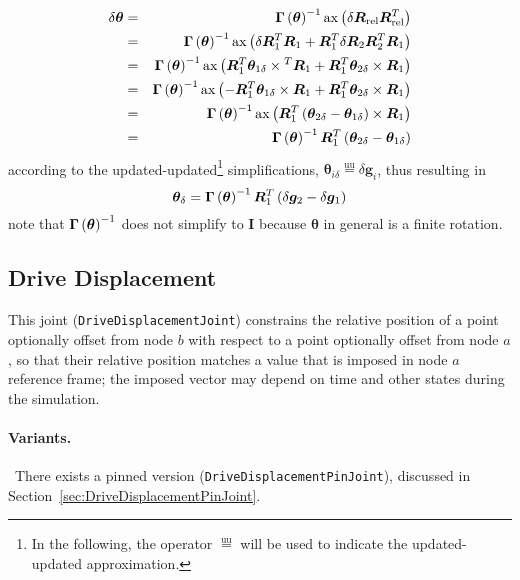 \documentclass[10pt,dvips,fleqn,subeqn]{report}
\newcommand{\T}[1]{\bm{#1}}
\newcommand{\equu}{\overset{\text{uu}}{=}}
\begin{document}
\begin{eqnarray*}
	\delta\T{\theta}
		& = & \T{\Gamma}\plbr{\T{\theta}}^{-1} 
			\llk{ax}\plbr{\delta\T{R}_{\text{rel}} \T{R}_{\text{rel}}^T} \\
		& = & \T{\Gamma}\plbr{\T{\theta}}^{-1} \llk{ax}\plbr{
			\delta\T{R}_1^T \T{R}_1
			+ \T{R}_1^T \delta\T{R}_2 \T{R}_2^T \T{R}_1
		} \\
		& = & \T{\Gamma}\plbr{\T{\theta}}^{-1} \llk{ax}\plbr{
			\T{R}_1^T \T{\theta}_{1\delta}\times{}^T \T{R}_1
			+ \T{R}_1^T \T{\theta}_{2\delta}\times{} \T{R}_1
		} \\
		& = & \T{\Gamma}\plbr{\T{\theta}}^{-1} \llk{ax}\plbr{
			- \T{R}_1^T \T{\theta}_{1\delta}\times{} \T{R}_1
			+ \T{R}_1^T \T{\theta}_{2\delta}\times{} \T{R}_1
		} \\
		& = & \T{\Gamma}\plbr{\T{\theta}}^{-1}
			\llk{ax} \plbr{
				\T{R}_1^T \plbr{
					\T{\theta}_{2\delta}
					- \T{\theta}_{1\delta}
				}\times \T{R}_1
			} \\
		& = & \T{\Gamma}\plbr{\T{\theta}}^{-1} \T{R}_1^T \plbr{
			\T{\theta}_{2\delta} - \T{\theta}_{1\delta}
		}
\end{eqnarray*}
according to the updated-updated\footnote{In the following, 
the operator $\equu$ will be used to indicate the updated-updated
approximation.} simplifications,
$\T{\theta}_{i\delta}\equu\delta\T{g}_i$, thus resulting in
\begin{equation}
	\T{\theta}_{\delta} = \T{\Gamma}\plbr{\T{\theta}}^{-1} \T{R}_1^T \plbr{
		\delta\T{g}_2 - \delta\T{g}_1
	}
	\label{eq:DRIVE-HINGE-theta-delta}
\end{equation}
note that $\T{\Gamma}\plbr{\T{\theta}}^{-1}$ does not simplify to $\T{I}$
because $\T{\theta}$ in general is a finite rotation.



\subsection{Drive Displacement}
\label{sec:DriveDisplacementJoint}
This joint (\texttt{DriveDisplacementJoint}) constrains the relative position
of a point optionally offset from node $b$ with respect to a point
optionally offset from node $a$, so that their relative position matches
a value that is imposed in node $a$ reference frame; the imposed vector
may depend on time and other states during the simulation.

\paragraph{Variants.} \
There exists a pinned version (\texttt{DriveDisplacementPinJoint}),
discussed in Section~\ref{sec:DriveDisplacementPinJoint}.
\end{document}
